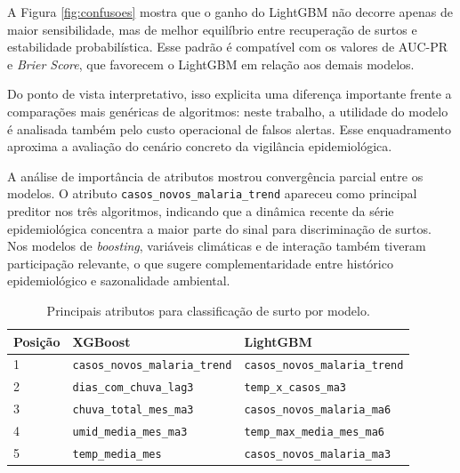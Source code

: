 A Figura \ref{fig:confusoes} mostra que o ganho do LightGBM n\~ao decorre apenas de maior sensibilidade, mas de melhor equil\'ibrio entre recupera\c{c}\~ao de surtos e estabilidade probabil\'istica. Esse padr\~ao \'e compat\'ivel com os valores de AUC-PR e \textit{Brier Score}, que favorecem o LightGBM em rela\c{c}\~ao aos demais modelos.

Do ponto de vista interpretativo, isso explicita uma diferen\c{c}a importante frente a compara\c{c}\~oes mais gen\'ericas de algoritmos: neste trabalho, a utilidade do modelo \'e analisada tamb\'em pelo custo operacional de falsos alertas. Esse enquadramento aproxima a avalia\c{c}\~ao do cen\'ario concreto da vigil\^ancia epidemiol\'ogica.


A an\'alise de import\^ancia de atributos mostrou converg\^encia parcial entre os modelos. O atributo \texttt{casos\_novos\_malaria\_trend} apareceu como principal preditor nos tr\^es algoritmos, indicando que a din\^amica recente da s\'erie epidemiol\'ogica concentra a maior parte do sinal para discrimina\c{c}\~ao de surtos. Nos modelos de \textit{boosting}, vari\'aveis clim\'aticas e de intera\c{c}\~ao tamb\'em tiveram participa\c{c}\~ao relevante, o que sugere complementaridade entre hist\'orico epidemiol\'ogico e sazonalidade ambiental.

\begin{table}[H]
\centering
\caption{Principais atributos para classifica\c{c}\~ao de surto por modelo.}
\label{tab:atributos}
\tabelafonte
\begin{tabular}{lll}
\toprule
Posi\c{c}\~ao & XGBoost & LightGBM \\
\midrule
1 & \texttt{casos\_novos\_malaria\_trend} & \texttt{casos\_novos\_malaria\_trend} \\
2 & \texttt{dias\_com\_chuva\_lag3} & \texttt{temp\_x\_casos\_ma3} \\
3 & \texttt{chuva\_total\_mes\_ma3} & \texttt{casos\_novos\_malaria\_ma6} \\
4 & \texttt{umid\_media\_mes\_ma3} & \texttt{temp\_max\_media\_mes\_ma6} \\
5 & \texttt{temp\_media\_mes} & \texttt{casos\_novos\_malaria\_ma3} \\
\bottomrule
\end{tabular}
\end{table}

